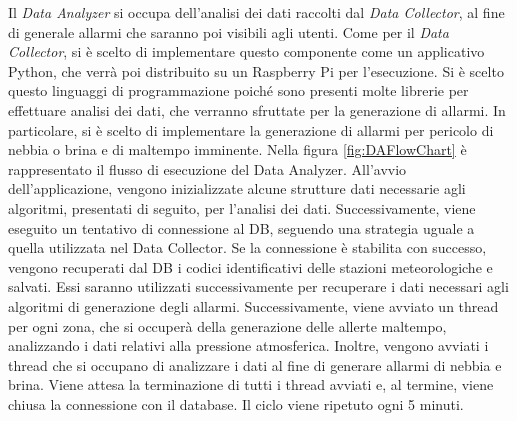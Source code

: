Il \textit{Data Analyzer} si occupa dell'analisi dei dati raccolti dal \textit{Data Collector}, al fine di generale allarmi che saranno poi visibili agli utenti. Come per il \textit{Data Collector}, si è scelto di implementare questo componente come un applicativo Python, che verrà poi distribuito su un Raspberry Pi per l'esecuzione. Si è scelto questo linguaggi di programmazione poiché sono presenti molte librerie per effettuare analisi dei dati, che verranno sfruttate per la generazione di allarmi. In particolare, si è scelto di implementare la generazione di allarmi per pericolo di nebbia o brina e di maltempo imminente. Nella figura \ref{fig:DAFlowChart} è rappresentato il flusso di esecuzione del Data Analyzer. All'avvio dell'applicazione, vengono inizializzate alcune strutture dati necessarie agli algoritmi, presentati di seguito, per l'analisi dei dati. Successivamente, viene eseguito un tentativo di connessione al DB, seguendo una strategia uguale a quella utilizzata nel Data Collector. Se la connessione è stabilita con successo, vengono recuperati dal DB i codici identificativi delle stazioni meteorologiche e salvati. Essi saranno utilizzati successivamente per recuperare i dati necessari agli algoritmi di generazione degli allarmi. Successivamente, viene avviato un thread per ogni zona, che si occuperà della generazione delle allerte maltempo, analizzando i dati relativi alla pressione atmosferica. Inoltre, vengono avviati i thread che si occupano di analizzare i dati al fine di generare allarmi di nebbia e brina. Viene attesa la terminazione di tutti i thread avviati e, al termine, viene chiusa la connessione con il database. Il ciclo viene ripetuto ogni 5 minuti.

